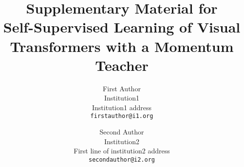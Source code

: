 \documentclass[10pt,twocolumn,letterpaper]{article}
\begin{document}
\title{Supplementary Material for \\
Self-Supervised Learning of Visual Transformers with a Momentum Teacher}
\author{First Author\\
Institution1\\
Institution1 address\\
{\tt\small firstauthor@i1.org}
\and
Second Author\\
Institution2\\
First line of institution2 address\\
{\tt\small secondauthor@i2.org}
}

\maketitle
\ificcvfinal\thispagestyle{empty}\fi




\clearpage

{\small


}
\end{document}
